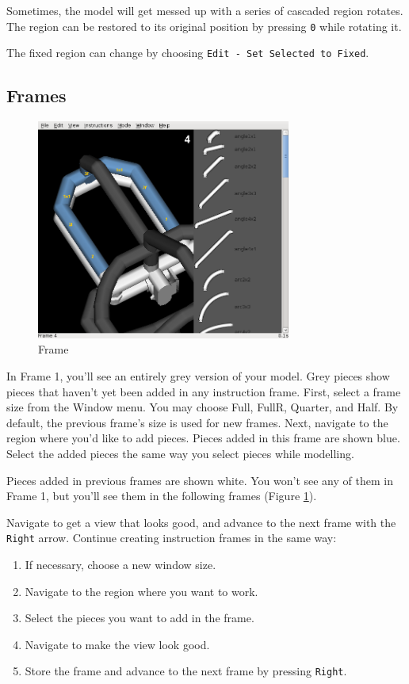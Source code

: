 \documentclass[12pt]{report}
\begin{document}
Sometimes, the model will get messed up with a series of cascaded
region rotates.  The region can be restored to its original position
by pressing {\tt 0} while rotating it.

The fixed region can change by choosing {\tt Edit - Set Selected to
  Fixed}.

\subsection{Frames}

\begin{figure}[h]
\begin{center}
\includegraphics[width=3.29in]{doc_images/manual_instructions_frame1.png}
\caption{Frame}
\label{InstructionsFrame}
\end{center}
\end{figure}

In Frame 1, you'll see an entirely grey version of your model.  Grey
pieces show pieces that haven't yet been added in any instruction
frame.  First, select a frame size from the Window menu.  You may
choose Full, FullR, Quarter, and Half.  By default, the previous
frame's size is used for new frames.  Next, navigate to the region
where you'd like to add pieces.  Pieces added in this frame are shown
blue.  Select the added pieces the same way you select pieces while
modelling.

Pieces added in previous frames are shown white.  You won't see any of
them in Frame 1, but you'll see them in the following frames (Figure
\ref{InstructionsFrame}).

Navigate to get a view that looks good, and advance to the next frame
with the {\tt Right} arrow.  Continue creating instruction frames in
the same way:

\begin{enumerate}

  \item If necessary, choose a new window size.
  \item Navigate to the region where you want to work.
  \item Select the pieces you want to add in the frame.
  \item Navigate to make the view look good.
  \item Store the frame and advance to the next frame by pressing {\tt Right}.

\end{enumerate}
\end{document}
